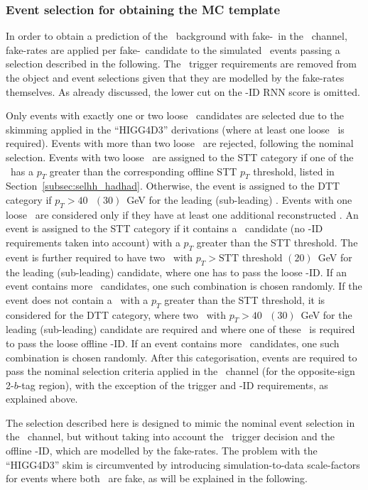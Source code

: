 \subsubsection{Event selection for obtaining the MC template}
In order to obtain a prediction of the \ttbar\ background with fake-\tauhad\ in the \hadhad\ channel, fake-rates are applied per fake-\tauhad\ candidate to the simulated \ttbar\ events passing a selection described in the following. The \tauhad\ trigger requirements are removed from the object and event selections given that they are modelled by the fake-rates themselves. As already discussed, the lower cut on the \tauhad-ID RNN score is omitted.

Only events with exactly one or two loose \tauhad\ candidates are selected due to the skimming applied in the ``HIGG4D3'' derivations (where at least one loose \tauhad\ is required). Events with more than two loose \tauhad\ are rejected, following the nominal selection. Events with two loose \tauhad\ are assigned to the STT category if one of the \tauhad\ has a $p_T$ greater than the corresponding offline STT $p_T$ threshold, listed in Section~\ref{subsec:selhh_hadhad}. Otherwise, the event is assigned to the DTT category if $p_T>40\text{ }(30)$~GeV for the leading (sub-leading) \tauhad. Events with one loose \tauhad\ are considered only if they have at least one additional reconstructed \tauhad. An event is assigned to the STT category if it contains a \tauhad\ candidate (no \tauhad-ID requirements taken into account) with a $p_T$ greater than the STT threshold. The event is further required to have two \tauhad\ with $p_T>\text{STT threshold }(20)$~GeV for the leading (sub-leading) candidate, where one has to pass the loose \tauhad-ID. If an event contains more \tauhad\ candidates, one such combination is chosen randomly. If the event does not contain a \tauhad\ with a $p_T$ greater than the STT threshold, it is considered for the DTT category, where two \tauhad\ with $p_T>40\text{ }(30)$~GeV for the leading (sub-leading) candidate are required and where one of these \tauhad\ is required to pass the loose offline \tauhad-ID. If an event contains more \tauhad\ candidates, one such combination is chosen randomly. After this categorisation, events are required to pass the nominal selection criteria applied in the \hadhad\ channel (for the opposite-sign 2-$b$-tag region), with the exception of the trigger and \tauhad-ID requirements, as explained above.

The selection described here is designed to mimic the nominal event selection in the \hadhad\ channel, but without taking into account the \tauhad\ trigger decision and the offline \tauhad-ID, which are modelled by the fake-rates. The problem with the ``HIGG4D3'' skim is circumvented by introducing simulation-to-data scale-factors for events where both \tauhad\ are fake, as will be explained in the following.

